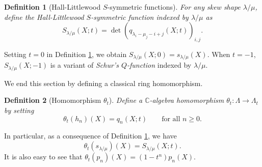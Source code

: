 \documentclass[revision]{FPSAC2024}
\newtheorem{defn}{Definition}
\newcommand{\la}{\lambda}
\newcommand{\CC}{\mathbb{C}} %
\begin{document}
\begin{defn}[Hall-Littlewood $S$-symmetric functions]
\label{defn.S_HL}
For any skew shape $\la/\mu$, define the \emph{Hall-Littlewood $S$-symmetric function} indexed by $\la/\mu$ as
\begin{equation}
S_{\la/\mu}(X;t) = \det \left (q_{\la_i-\mu_j-i+j}(X;t) \right)_{i,j}.
\end{equation} 
\end{defn}
\noindent Setting $t=0$ in Definition \ref{defn.S_HL}, we obtain $S_{\la/\mu}(X;0) = s_{\la/\mu}(X)$.
When $t=-1$, $S_{\la/\mu}(X;-1)$ is a variant of \emph{Schur's $Q$-function} indexed by $\la/\mu$.

We end this section by defining a classical ring homomorphism.
 \begin{defn}[Homomorphism $\theta_t$]
\label{defn.morph}
Define a $\CC$-algebra homomorphism $\theta_t : \Lambda \longrightarrow \Lambda_t$ by setting
$$\theta_t(h_n)(X) = q_n(X;t) \qquad \text{for all } n \geq 0.$$
\end{defn}
\noindent In particular, %
as a consequence of Definition \ref{defn.S_HL}, we have $$\theta_t(s_{\la/\mu})(X) = S_{\la/\mu}(X;t).$$ 
It is also easy to see that $\theta_t(p_n)(X) = (1-t^n)p_n(X)$.

\end{document}
